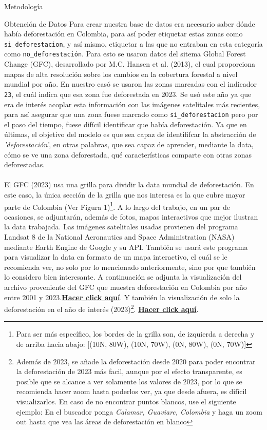 \documentclass[11pt]{article}
\begin{document}
\begin{section}{Metodología}
\begin{subsection}{Obtención de Datos}
Para crear nuestra base de datos era necesario saber dónde había deforestación en Colombia, para así poder etiquetar estas zonas como \texttt{si\_deforestacion}, y así mismo, etiquetar a las que no entraban en esta categoría como \texttt{no\_deforestación}. Para esto se usaron datos del sitema Global Forest Change (GFC), desarrollado por M.C. Hansen et al. (2013), el cual proporciona mapas de alta resolución sobre los cambios en la cobertura forestal a nivel mundial por año. En nuestro casó se usaron las zonas marcadas con el indicador \texttt{23}, el cuál indica que esa zona fue deforestada en 2023. Se usó este año ya que era de interés acoplar esta información con las imágenes satelitales más recientes, para así asegurar que una zona fuese marcado como \texttt{si\_deforestacion} pero por el paso del tiempo, fuese difícil identificar que había deforestación. Ya que en últimas, el objetivo del modelo es que sea capaz de identififcar la abstracción de \textit{'deforestación'}, en otras palabras, que sea capaz de aprender, mediante la data, cómo se ve una zona deforestada, qué características comparte con otras zonas deforestadas. 
\\
\\
El GFC (2023) usa una grilla para dividir la data mundial de deforestación. En este caso, la única sección de la grilla que nos interesa es la que cubre mayor parte de Colombia (Ver Figura 1)\footnote{Para ser más específico, los bordes de la grilla son, de izquierda a derecha y de arriba hacia abajo: [(10N, 80W), (10N, 70W), (0N, 80W), (0N, 70W)]}. A lo largo del trabajo, en un par de ocasiones, se adjuntarán, además de fotos, mapas interactivos que mejor ilustran la data trabajada. Las imágenes satelitales usadas provienen del programa Landsat 8 de la National Aeronautics and Space Administration (NASA) mediante Earth Engine de Google y su API. También se usará este programa para visualizar la data en formato de un mapa interactivo, el cuál se le recomienda ver, no solo por lo mencionado anteriormente, sino por que también lo considero bien interesante. A continuación se adjunta la visualización del archivo proveniente del GFC que muestra deforestación en Colombia por año entre 2001 y 2023.\textbf{\href{https://ee-thomaspradaes.projects.earthengine.app/view/ml-para-economistas-2}{Hacer click aquí}}. Y también la visualización de solo la deforestación en el año de interés (2023)\footnote{Además de 2023, se añade la deforestación desde 2020 para poder encontrar la deforestación de 2023 más facil, aunque por el efecto transparente, es posible que se alcance a ver solamente los valores de 2023, por lo que se recomienda hacer zoom hasta poderlos ver, ya que desde afuera, es difícil visualizarlos. En caso de no encontrar puntos blancos, use el siguiente ejemplo: En el buscador ponga \textit{Calamar, Guaviare, Colombia} y haga un zoom out hasta que vea las áreas de deforestación en blanco}. \textbf{\href{https://ee-thomaspradaes.projects.earthengine.app/view/loss-2022-2023}{Hacer click aquí}}. 


\end{subsection}
\end{section}
\end{document}
